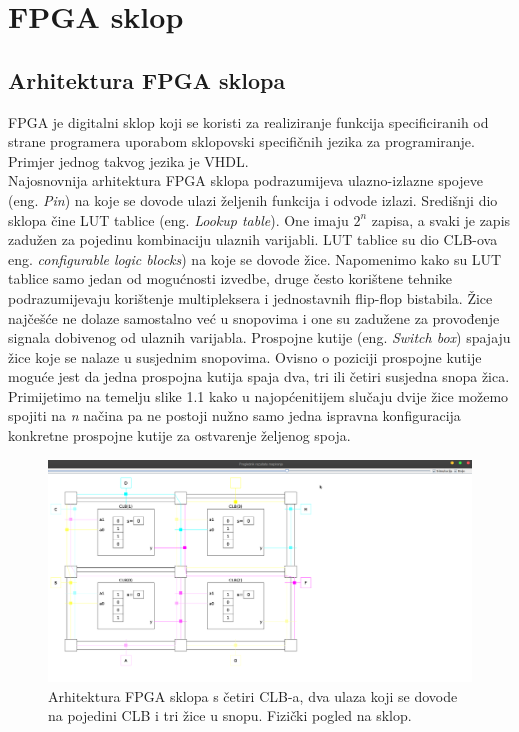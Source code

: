 \documentclass[times, utf8, zavrsni]{fer}
\begin{document}
\section{FPGA sklop}

\subsection{Arhitektura FPGA sklopa}

FPGA je digitalni sklop koji se koristi za realiziranje funkcija specificiranih od strane programera uporabom sklopovski specifičnih jezika za programiranje. Primjer jednog takvog jezika je VHDL.\\ Najosnovnija arhitektura FPGA sklopa podrazumijeva ulazno-izlazne spojeve (eng. \emph{Pin}) na koje se dovode ulazi željenih funkcija i odvode izlazi. Središnji dio sklopa čine LUT tablice (eng. \emph{Lookup table}). One imaju $2^n$ zapisa, a svaki je zapis zadužen za pojedinu kombinaciju ulaznih varijabli. LUT tablice su dio CLB-ova eng. \emph{configurable logic blocks}) na koje se dovode žice. Napomenimo kako su LUT tablice samo jedan od mogućnosti izvedbe, druge često korištene tehnike podrazumijevaju korištenje multipleksera i jednostavnih flip-flop bistabila. Žice najčešće ne dolaze samostalno već u snopovima i one su zadužene za provođenje signala dobivenog od ulaznih varijabla. Prospojne kutije (eng. \emph{Switch box}) spajaju žice koje se nalaze u susjednim snopovima. Ovisno o poziciji prospojne kutije moguće jest da jedna prospojna kutija spaja dva, tri ili četiri susjedna snopa žica.\\ Primijetimo na temelju slike 1.1 kako u najopćenitijem slučaju dvije žice možemo spojiti na \emph{n} načina pa ne postoji nužno samo jedna ispravna konfiguracija konkretne prospojne kutije za ostvarenje željenog spoja.

\begin{figure}[H]
\centering
\includegraphics[width=20cm]{slike/arhFPGA.png}
\caption{Arhitektura FPGA sklopa s četiri CLB-a, dva ulaza koji se dovode na pojedini CLB i tri žice u snopu. Fizički pogled na sklop.}
\label{fig:arh-fpga}
\end{figure}
\end{document}
